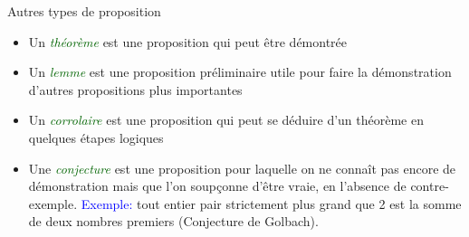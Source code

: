 \begin{frame}{Autres types de proposition}
\begin{itemize}
\item Un \textcolor{darkgreen}{\em théorème} est une proposition qui peut être démontrée
\item Un \textcolor{darkgreen}{\em lemme} est une proposition préliminaire utile pour faire la démonstration d'autres propositions plus importantes
\item Un \textcolor{darkgreen}{\em corrolaire} est une proposition qui peut se déduire d'un théorème en quelques étapes logiques
\item Une \textcolor{darkgreen}{\em conjecture} est une proposition pour laquelle on ne connaît pas encore de démonstration mais que l'on soupçonne d'être vraie, en l'absence de contre-exemple. \textcolor{blue}{Exemple:} tout entier pair strictement plus grand que 2 est la somme de deux nombres premiers (Conjecture de Golbach).
\end{itemize}
\end{frame}



